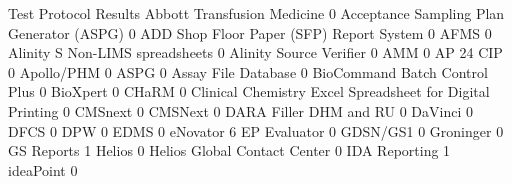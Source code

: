 \documentclass{article}
\begin{document}
\begin{Schunk}
\begin{Soutput}
                                                            Test Protocol Results
  Abbott Transfusion Medicine                                                   0
  Acceptance Sampling Plan Generator (ASPG)                                     0
  ADD Shop Floor Paper (SFP) Report System                                      0
  AFMS                                                                          0
  Alinity S Non-LIMS spreadsheets                                               0
  Alinity Source Verifier                                                       0
  AMM                                                                           0
  AP 24 CIP                                                                     0
  Apollo/PHM                                                                    0
  ASPG                                                                          0
  Assay File Database                                                           0
  BioCommand Batch Control Plus                                                 0
  BioXpert                                                                      0
  CHaRM                                                                         0
  Clinical Chemistry Excel Spreadsheet for Digital Printing                     0
  CMSnext                                                                       0
  CMSNext                                                                       0
  DARA Filler DHM and RU                                                        0
  DaVinci                                                                       0
  DFCS                                                                          0
  DPW                                                                           0
  EDMS                                                                          0
  eNovator                                                                      6
  EP Evaluator                                                                  0
  GDSN/GS1                                                                      0
  Groninger                                                                     0
  GS Reports                                                                    1
  Helios                                                                        0
  Helios Global Contact Center                                                  0
  IDA Reporting                                                                 1
  ideaPoint                                                                     0

\end{Soutput}
\end{Schunk}
\end{document}
